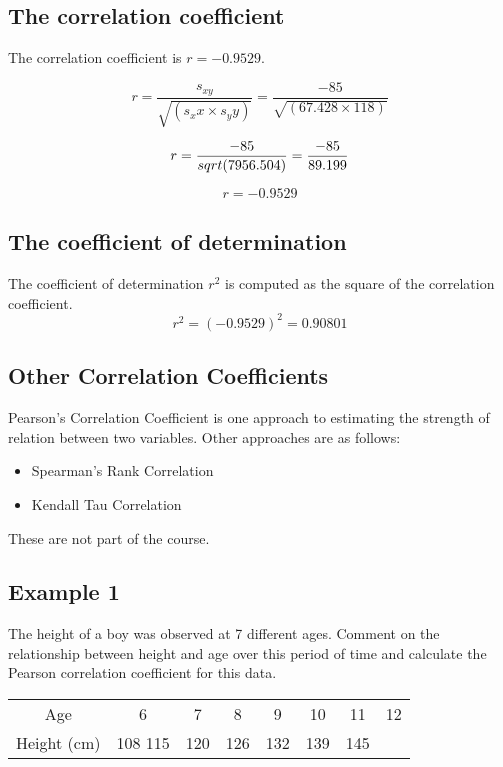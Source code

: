 \documentclass[]{report}
\begin{document}
\subsection*{The correlation coefficient}
The correlation coefficient is $r = -0.9529$.

\[ r = \frac{s_{xy}}{\sqrt{(s_xx \times s_yy)}}= \frac{-85}{\sqrt{(67.428 \times 118)}}\]

\[r= \frac{-85}{sqrt{(7956.504)}} =  {-85 \over 89.199}  \]

\[r = -0.9529\]

\subsection*{The coefficient of determination}
The coefficient of determination $r^2$ is computed as the square of the correlation coefficient.
\[r^2 = (-0.9529)^2 = 0.90801\]




\subsection{Other Correlation Coefficients}
Pearson's Correlation Coefficient is one approach to estimating the strength of relation between two variables.
Other approaches are as follows:
\begin{itemize}
	\item Spearman's Rank Correlation
	\item Kendall Tau Correlation
\end{itemize}
These are not part of the course.


\subsection{Example 1}
The height of a boy was observed at 7 different ages.
Comment on the relationship between height and age over this
period of time and calculate the Pearson correlation coefficient for
this data.

\begin{center}
\begin{tabular}{|c|c|c|c|c|c|c|c|}
Age  & 6 & 7  & 8 & 9 & 10 & 11 & 12 \\ 
Height (cm)& 108 115& 120 &126& 132& 139 & 145\\
\end{tabular} 

\end{center}
\end{document}
